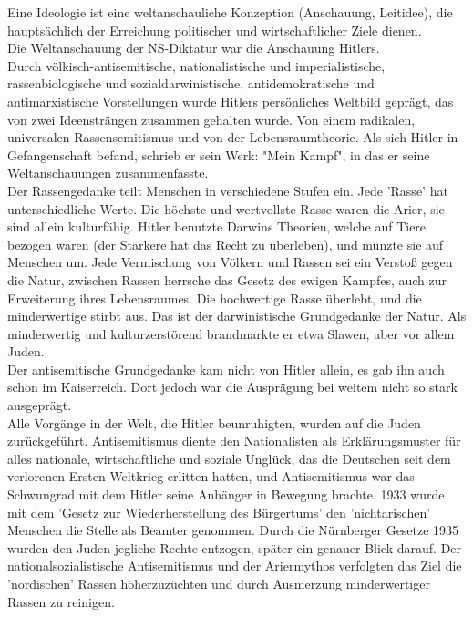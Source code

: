 \documentclass[letterpaper, 12pt]{article}
\begin{document}

Eine Ideologie ist eine weltanschauliche Konzeption (Anschauung, Leitidee), die hauptsächlich der Erreichung politischer und wirtschaftlicher Ziele dienen. \\
Die Weltanschauung der NS-Diktatur war die Anschauung Hitlers. \\
Durch völkisch-antisemitische, nationalistische und imperialistische, rassenbiologische und sozialdarwinistische, antidemokratische und antimarxistische Vorstellungen wurde Hitlers persönliches Weltbild geprägt, das von zwei Ideensträngen zusammen gehalten wurde. Von einem radikalen, universalen Rassensemitismus und von der Lebensraumtheorie. Als sich Hitler in Gefangenschaft befand, schrieb er sein Werk: "Mein Kampf", in das er seine Weltanschauungen zusammenfasste. \\
Der Rassengedanke teilt Menschen in verschiedene Stufen ein. Jede 'Rasse' hat unterschiedliche Werte. Die höchste und wertvollste Rasse waren die Arier, sie sind allein kulturfähig. Hitler benutzte Darwins Theorien, welche auf Tiere bezogen waren (der Stärkere hat das Recht zu überleben), und münzte sie auf Menschen um. Jede Vermischung von Völkern und Rassen sei ein Verstoß gegen die Natur, zwischen Rassen herrsche das Gesetz des ewigen Kampfes, auch zur Erweiterung ihres Lebensraumes. Die hochwertige Rasse überlebt, und die minderwertige stirbt aus. Das ist der darwinistische Grundgedanke der Natur. Als minderwertig und kulturzerstörend brandmarkte er etwa Slawen, aber vor allem Juden. \\
Der antisemitische Grundgedanke kam nicht von Hitler allein, es gab ihn auch schon im Kaiserreich. Dort jedoch war die Ausprägung bei weitem nicht so stark ausgeprägt. \\
Alle Vorgänge in der Welt, die Hitler beunruhigten, wurden auf die Juden zurückgeführt. Antisemitismus diente den Nationalisten als Erklärungsmuster für alles nationale, wirtschaftliche und soziale Unglück, das die Deutschen seit dem verlorenen Ersten Weltkrieg erlitten hatten, und Antisemitismus war das Schwungrad mit dem Hitler seine Anhänger in Bewegung brachte. 1933 wurde mit dem 'Gesetz zur Wiederherstellung des Bürgertums' den 'nichtarischen' Menschen die Stelle als Beamter genommen. Durch die Nürnberger Gesetze 1935 wurden den Juden jegliche Rechte entzogen, später ein genauer Blick darauf. Der nationalsozialistische Antisemitismus und der Ariermythos verfolgten das Ziel die 'nordischen' Rassen höherzuzüchten und durch Ausmerzung minderwertiger Rassen zu reinigen. \\
\end{document}
